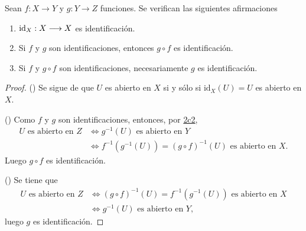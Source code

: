 

\begin{proposition}
Sean $f : X \longrightarrow Y$ y $g : Y \longrightarrow Z$ funciones. Se verifican las siguientes afirmaciones
\begin{enumerate}[label=\textnormal{(\roman*)}]
\item $\textnormal{id}_X : X \longrightarrow X$ es identificación.
\item Si $f$ y $g$ son identificaciones, entonces $g \circ f$ es identificación.
\item Si $f$ y $g \circ f$ son identificaciones, necesariamente $g$ es identificación.
\end{enumerate}
\end{proposition}

\begin{proof}
({\scshape{}}) Se sigue de que $U$ es abierto en $X$ si y sólo si $\text{id}_X(U) = U$ es abierto en $X$.
\bigskip

({\scshape{}}) Como $f$ y $g$ son identificaciones, entonces, por \hyperref[card:2c2]{\textsf{2c2}},
\begin{align*}
    U \text{ es abierto en } Z & \iff g^{-1}(U) \text{ es abierto en } Y \\
                               & \iff f^{-1}(g^{-1}(U)) = (g \circ f)^{-1}(U) \text{ es abierto en } X.
\end{align*}
Luego $g \circ f$ es identificación.
\bigskip

({\scshape{}}) Se tiene que
\begin{align*}
    U \text{ es abierto en } Z & \iff (g \circ f)^{-1}(U) = f^{-1}(g^{-1}(U)) \text{ es abierto en } X \\
                               & \iff g^{-1}(U) \text{ es abierto en } Y,
\end{align*}
luego $g$ es identificación.
\end{proof}
